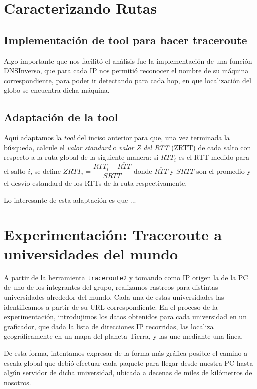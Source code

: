 \documentclass[final,inline,a4paper,narroweqnarray]{ieee}
\let\Oldsection\section
\renewcommand{\section}{\FloatBarrier\Oldsection}
\let\Oldsubsection\subsection
\renewcommand{\subsection}{\FloatBarrier\Oldsubsection}
\begin{document}
\section{ Caracterizando Rutas}

\subsection{ Implementación de tool para hacer traceroute }
Algo importante que nos facilitó el análisis fue la implementación de una función
DNSInverso, que para cada IP nos permitió reconocer el nombre de su máquina correspondiente,
para poder ir detectando para cada hop, en que localización del globo se encuentra dicha
máquina. 

\subsection{ Adaptación de la tool }
Aquí adaptamos la \emph{tool} del inciso anterior para que, una vez terminada 
la búsqueda, calcule el \emph{valor standard}  o \emph{valor Z del RTT} (ZRTT) 
de cada salto con respecto a la ruta global de la siguiente manera: si $RTT_i$ 
es el RTT medido para el salto $i$, se define $ ZRTT_i = \dfrac{RTT_i 
- \overline{RTT}}{SRTT} $ donde $\overline{RTT}$ y $SRTT$ son el promedio 
y el desvío estandard de los RTTs de la ruta respectivamente.  

Lo interesante de esta adaptación es que ...

\section{ Experimentación: Traceroute a universidades del mundo }

A partir de la herramienta \texttt{traceroute2} y tomando como IP origen la de la PC de uno de los integrantes del grupo,
realizamos rastreos para distintas universidades alrededor del mundo. Cada una de estas universidades las identificamos
a partir de su URL correspondiente. 
En el proceso de la experimentación, introdujimos los datos obtenidos para cada universidad en un graficador, que 
dada la lista de direcciones IP recorridas, las localiza geográficamente en un mapa del planeta Tierra, 
y las une mediante una línea. 

De esta forma, intentamos expresar de la forma más gráfica posible el camino a 
escala global que debió efectuar cada paquete para llegar desde nuestra PC hasta algún servidor de dicha universidad, 
ubicada a decenas de miles de kilómetros de nosotros. 
\end{document}
